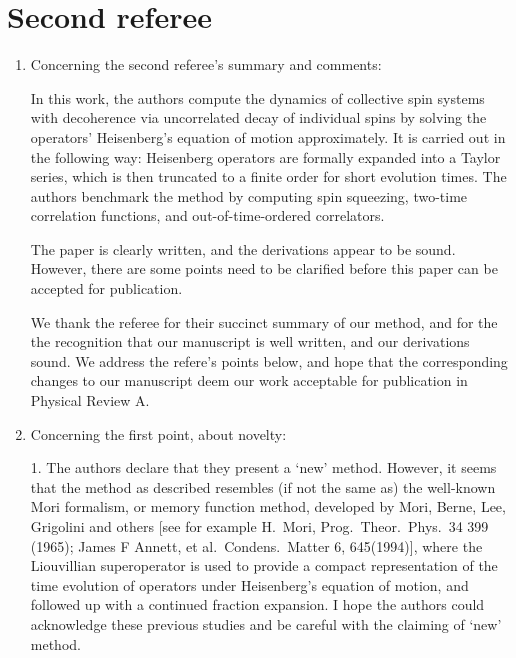 \documentclass[preprint,superscriptaddress]{revtex4-2}
\newcommand{\1}{\mathds{1}}
\newcommand{\blue}[1]{{\color{blue} #1}}
\begin{document}
\section{Second referee}

\begin{enumerate}
\item Concerning the second referee's summary and comments:

  \blue{In this work, the authors compute the dynamics of collective
    spin systems with decoherence via uncorrelated decay of individual
    spins by solving the operators’ Heisenberg’s equation of motion
    approximately.  It is carried out in the following way: Heisenberg
    operators are formally expanded into a Taylor series, which is
    then truncated to a finite order for short evolution times. The
    authors benchmark the method by computing spin squeezing, two-time
    correlation functions, and out-of-time-ordered correlators.

    The paper is clearly written, and the derivations appear to be
    sound.  However, there are some points need to be clarified before
    this paper can be accepted for publication.}

  We thank the referee for their succinct summary of our method, and
  for the the recognition that our manuscript is well written, and our
  derivations sound.  We address the refere's points below, and hope
  that the corresponding changes to our manuscript deem our work
  acceptable for publication in Physical Review A.


\item Concerning the first point, about novelty:

  \blue{1. The authors declare that they present a ‘new’
    method. However, it seems that the method as described resembles
    (if not the same as) the well-known Mori formalism, or memory
    function method, developed by Mori, Berne, Lee, Grigolini and
    others [see for example H.~Mori, Prog.~Theor.~Phys.~34 399
    (1965); James F Annett, et al.~Condens.~Matter 6, 645(1994)],
    where the Liouvillian superoperator is used to provide a compact
    representation of the time evolution of operators under
    Heisenberg’s equation of motion, and followed up with a continued
    fraction expansion. I hope the authors could acknowledge these
    previous studies and be careful with the claiming of ‘new’
    method.}


\end{enumerate}
\end{document}
